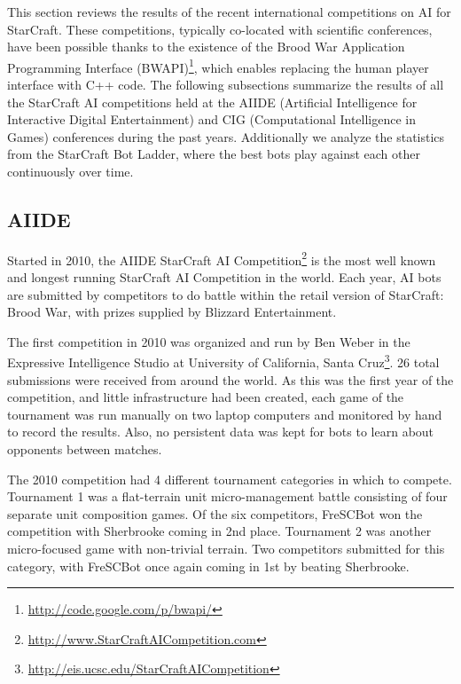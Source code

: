 \documentclass[journal]{IEEEtran}
\begin{document}
This section reviews the results of the recent international competitions on AI for StarCraft. These competitions, typically co-located with scientific conferences, have been possible thanks to the existence of the Brood War Application Programming Interface 
(BWAPI)\footnote{\url{http://code.google.com/p/bwapi/}}, which 
enables replacing the human player interface with C++ code.
The following subsections summarize the results of all the StarCraft AI competitions held at the AIIDE (Artificial Intelligence for Interactive Digital Entertainment) and CIG (Computational Intelligence in Games) conferences during the past years. Additionally we analyze the statistics from the StarCraft Bot Ladder, where the best bots play against each other continuously over time. 

\subsection{AIIDE}\label{sec:AIIDE}

Started in 2010, the AIIDE StarCraft AI Competition\footnote{\url{http://www.StarCraftAICompetition.com}} is the most
well known and longest running StarCraft AI Competition in the world. Each year,
AI bots are submitted by competitors to do battle within the retail version of
StarCraft: Brood War, with prizes supplied by Blizzard Entertainment. %


The first competition in 2010 was organized and run by Ben Weber in the Expressive
Intelligence Studio at University of California, Santa Cruz\footnote{\url{http://eis.ucsc.edu/StarCraftAICompetition}}. 26 total submissions
were received from around the world. As this was the first year of the competition,
and little infrastructure had been created, each game of the tournament was run 
manually on two laptop computers and monitored by hand to record the results. Also,
no persistent data was kept for bots to learn about opponents between matches.

The 2010 competition had 4 different tournament categories in which to compete. Tournament 1
was a flat-terrain unit micro-management battle consisting of four separate unit
composition games. Of the six competitors, FreSCBot won the competition with
Sherbrooke coming in 2nd place. Tournament 2 was another micro-focused game with
non-trivial terrain. Two competitors submitted for this category, with FreSCBot
once again coming in 1st by beating Sherbrooke.
\end{document}
